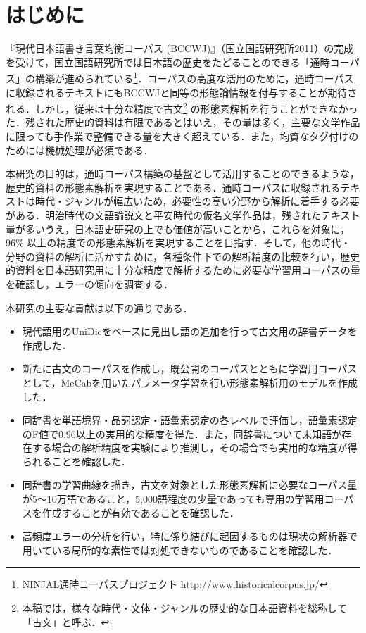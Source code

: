\documentclass[japanese]{jnlp_1.4}
\begin{document}
\maketitle

\section{はじめに}

『現代日本語書き言葉均衡コーパス (BCCWJ)』（国立国語研究所2011）\nocite{NINJAL2011}の完成を受けて，国立国語研究所では日本語の歴史をたどることのできる「通時コーパス」の構築が進められている\footnote{NINJAL通時コーパスプロジェクト http://www.historicalcorpus.jp/}\cite{近藤2012}．コーパスの高度な活用のために，通時コーパスに収録されるテキストにもBCCWJと同等の形態論情報を付与することが期待される．しかし，従来は十分な精度で古文\footnote{本稿では，様々な時代・文体・ジャンルの歴史的な日本語資料を総称して「古文」と呼ぶ．} の形態素解析を行うことができなかった．残された歴史的資料は有限であるとはいえ，その量は多く，主要な文学作品に限っても手作業で整備できる量を大きく超えている．また，均質なタグ付けのためには機械処理が必須である．

本研究の目的は，通時コーパス構築の基盤として活用することのできるような，歴史的資料の形態素解析を実現することである．通時コーパスに収録されるテキストは時代・ジャンルが幅広いため，必要性の高い分野から解析に着手する必要がある．明治時代の文語論説文と平安時代の仮名文学作品は，残されたテキスト量が多いうえ，日本語史研究の上でも価値が高いことから，これらを対象に，96\% 以上の精度での形態素解析を実現することを目指す．そして，他の時代・分野の資料の解析に活かすために，各種条件下での解析精度の比較を行い，歴史的資料を日本語研究用に十分な精度で解析するために必要な学習用コーパスの量を確認し，エラーの傾向を調査する．

本研究の主要な貢献は以下の通りである．

\begin{itemize}

\item 現代語用のUniDicをベースに見出し語の追加を行って古文用の辞書データを作成した．

\item 新たに古文のコーパスを作成し，既公開のコーパスとともに学習用コーパスとして，MeCabを用いたパラメータ学習を行い形態素解析用のモデルを作成した．
\item 同辞書を単語境界・品詞認定・語彙素認定の各レベルで評価し，語彙素認定のF値で0.96以上の実用的な精度を得た．また，同辞書について未知語が存在する場合の解析精度を実験により推測し，その場合でも実用的な精度が得られることを確認した．

\item 同辞書の学習曲線を描き，古文を対象とした形態素解析に必要なコーパス量が5〜10万語であること，5,000語程度の少量であっても専用の学習用コーパスを作成することが有効であることを確認した．

\item 高頻度エラーの分析を行い，特に係り結びに起因するものは現状の解析器で用いている局所的な素性では対処できないものであることを確認した．
\end{itemize}
\end{document}
